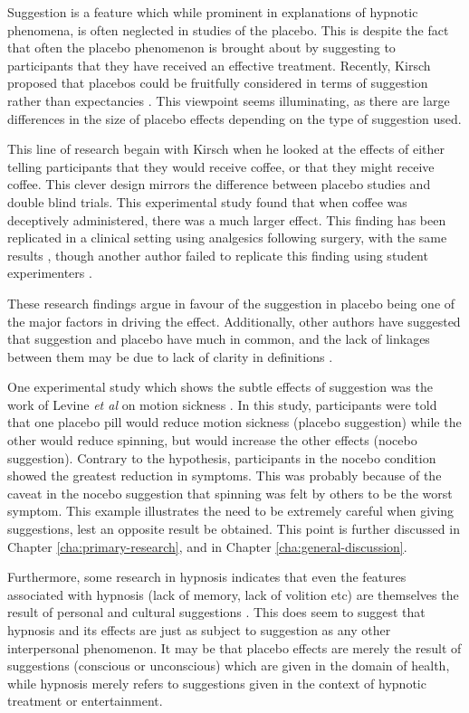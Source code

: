 Suggestion is a feature which while prominent in explanations of hypnotic phenomena, is often neglected in studies of the placebo. This is despite the fact that often the placebo phenomenon is brought about by suggesting to participants that they have received an effective treatment. Recently, Kirsch proposed that  placebos could be fruitfully considered in terms of suggestion rather than expectancies  \cite{Kirsch1999}. This viewpoint seems illuminating, as there are large differences in the size of placebo effects depending on the type of suggestion used. 

This line of research begain with Kirsch \cite{kirsch1988double} when he looked at the effects of either telling participants that they would receive coffee, or that they might receive coffee. This clever design  mirrors the difference between placebo studies and double blind trials. This experimental study found that when coffee was deceptively administered, there was a much larger effect. This finding has been replicated in a clinical setting using analgesics following surgery, with the same results \cite{Amanzio2001}, though another author failed to replicate this finding using student experimenters \cite{Walach2002}. 

 These research findings argue in favour of the suggestion in placebo being one of the major factors in driving the effect. Additionally, other authors have suggested that suggestion and placebo have much in common, and the lack of linkages between them may be due to lack of clarity in definitions \cite{DePascalis2002}. 

One experimental study which shows the subtle effects of suggestion was the work of Levine \textit{et al}  on motion sickness \cite{Levine2006}.  In this study, participants were told that one placebo pill would reduce motion sickness (placebo suggestion) while the other would reduce spinning, but would increase the other effects (nocebo suggestion). Contrary to the hypothesis, participants in the nocebo condition showed the greatest reduction in symptoms. This was probably because of the caveat in the nocebo suggestion that spinning was felt by others to be the worst symptom. This example illustrates the need to be extremely careful when giving suggestions, lest an opposite result be obtained. This point is further discussed in Chapter \ref{cha:primary-research}, and in Chapter \ref{cha:general-discussion}. 

Furthermore, some research in hypnosis indicates that even the features associated with hypnosis (lack of memory, lack of volition etc) are themselves the result of personal and cultural suggestions \cite{Kirsch1999}. This does seem to suggest that hypnosis and its effects are just as subject to suggestion as any other interpersonal phenomenon.  It may be that placebo effects are merely the result of suggestions (conscious or unconscious) which are given in the domain of health, while hypnosis merely refers to suggestions given in the context of hypnotic treatment or entertainment. 


